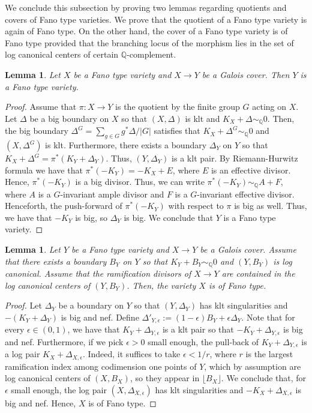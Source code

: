 \documentclass{amsart}
\renewcommand{\qq}{\mathbb{Q}}
\newtheorem{lemma}[theorem]{Lemma}
\theoremstyle{remark}
\numberwithin{equation}{section}
\begin{document}
We conclude this subsection by proving two lemmas regarding quotients and covers of Fano type varieties.
We prove that the quotient of a Fano type
variety is again of Fano type.
On the other hand, the cover of a Fano type variety 
is of Fano type provided that the branching locus of the morphism lies in the set of log canonical centers of certain $\qq$-complement.

\begin{lemma}\label{lem:quot-FT-is-FT}
Let $X$ be a Fano type variety and $X\rightarrow Y$ be a Galois cover.
Then $Y$ is a Fano type variety.
\end{lemma}

\begin{proof}
Assume that $\pi\colon X\rightarrow Y$ is the quotient by the finite group $G$ acting on $X$.
Let $\Delta$ be a big boundary on $X$ so that
$(X,\Delta)$ is klt and $K_X+\Delta\sim_\qq 0$.
Then, the big boundary $\Delta^G=\sum_{g\in G}g^*\Delta/|G|$
satisfies that $K_X+\Delta^G \sim_\qq 0$
and $(X,\Delta^G)$ is klt.
Furthermore, there exists a boundary $\Delta_Y$ on $Y$ so that
$K_X+\Delta^G=\pi^*(K_Y+\Delta_Y)$.
Thus, $(Y,\Delta_Y)$ is a klt pair.
By Riemann-Hurwitz formula we have that
$\pi^*(-K_Y)=-K_X+E$,
where $E$ is an effective divisor.
Hence, $\pi^*(-K_Y)$ is a big divisor.
Thus, we can write $\pi^*(-K_Y)\sim_\qq A+F$,
where $A$ is a $G$-invariant ample divisor
and $F$ is a $G$-invariant effective divisor.
Henceforth, the push-forward of $\pi^*(-K_Y)$
with respect to $\pi$ is big as well.
Thus, we have that $-K_Y$ is big, so $\Delta_Y$ is big.
We conclude that $Y$ is a Fano type variety.
\end{proof}

\begin{lemma}\label{lem:cover-FT-is-FT}
Let $Y$ be a Fano type variety and $X\rightarrow Y$ be a Galois cover. 
Assume that there exists a boundary $B_Y$ on $Y$ so that
$K_Y+B_Y\sim_\qq 0$ and $(Y,B_Y)$ is log canonical.
Assume that the ramification divisors
of $X\rightarrow Y$ are contained in the log canonical
centers of $(Y,B_Y)$.
Then, the variety $X$ is of Fano type.
\end{lemma}

\begin{proof}
Let $\Delta_Y$ be a boundary on $Y$ so that
$(Y,\Delta_Y)$ has klt singularities and $-(K_Y+\Delta_Y)$ is big and nef.
Define $\Delta'_{Y,\epsilon}:=(1-\epsilon)B_Y+\epsilon \Delta_Y$.
Note that for every $\epsilon \in (0,1)$,
we have that $K_Y+\Delta_{Y,\epsilon}$ is a klt pair
so that $-K_Y+\Delta_{Y,\epsilon}$ is big and nef.
Furthermore, 
if we pick $\epsilon>0$ small enough,
the pull-back of $K_Y+\Delta_{Y,\epsilon}$
is a log pair
$K_X+\Delta_{X,\epsilon}$.
Indeed, it suffices to take $\epsilon < 1/r$,
where $r$ is the largest ramification index among 
codimension one points of $Y$,
which by assumption are log canonical centers of $(X,B_X)$, so they appear in $\lfloor B_X\rfloor$.
We conclude that, for $\epsilon$ small enough,
the log pair $(X,\Delta_{X,\epsilon})$ has klt singularities
and $-K_X+\Delta_{X,\epsilon}$ is big and nef.
Hence, $X$ is of Fano type.
\end{proof}
\end{document}
